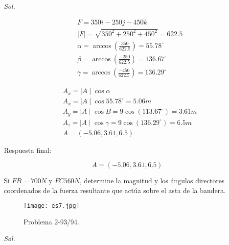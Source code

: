 \textit{ Sol.}

\begin{align*}
	 & F=350i-250j-450k                                               \\
	 & \mid F\mid=\sqrt{350^2+250^2+450^2}=622.5                      \\
	 & \alpha=\arccos\left(\frac{350}{622.5}\right)=55.78^{\circ}     \\
	 & \beta=\arccos\left( \frac{-250}{622.5} \right)=136.67^{\circ}  \\
	 & \gamma=\arccos \left( \frac{-450}{622.5}\right)=136.29^{\circ}
\end{align*}

\begin{align*}
	 & A_x=\mid A\mid \cos \alpha                             \\
	 & A_x=\mid A\mid \cos 55.78^{\circ}=5.06m                \\
	 & A_y=\mid A\mid \cos B=9\cos (113.67^{\circ})=3.61m     \\
	 & A_z=\mid A\mid\cos \gamma =9\cos (136.29^{\circ})=6.5m \\
	 & A=(-5.06,3.61,6.5)
\end{align*}

Respuesta final:

\begin{equation*}
	A=(-5.06,3.61,6.5)
\end{equation*}


\begin{problem}
Si $FB=700 N$ y $FC 560 N$, determine la magnitud y los ángulos directores coordenados de la fuerza resultante que actúa sobre el asta de la bandera.
\end{problem}

\begin{figure}[h!]
	\centering
	\texttt{[image: es7.jpg]}
	\caption{Problema 2-93/94.}
	\label{es7}
\end{figure}


\textit{ Sol.}

